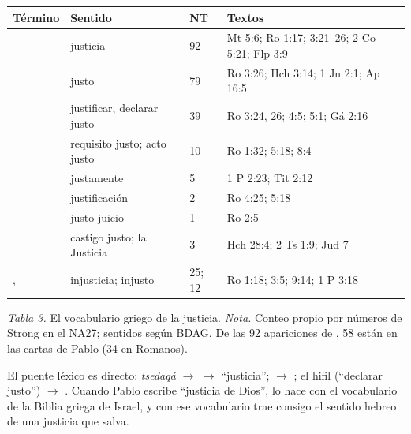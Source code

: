 \begin{center}\small\renewcommand{\arraystretch}{1.18}
\begin{tabular}{@{}L{3.0cm}L{3.6cm}L{1.3cm}L{5.6cm}@{}}
\toprule
\textbf{Término} & \textbf{Sentido} & \textbf{NT} & \textbf{Textos} \\ \midrule
{} & justicia & 92 & Mt 5:6; Ro 1:17; 3:21--26; 2 Co 5:21; Flp 3:9 \\
 & justo & 79 & Ro 3:26; Hch 3:14; 1 Jn 2:1; Ap 16:5 \\
 & justificar, declarar justo & 39 & Ro 3:24, 26; 4:5; 5:1; Gá 2:16 \\
 & requisito justo; acto justo & 10 & Ro 1:32; 5:18; 8:4 \\
 & justamente & 5 & 1 P 2:23; Tit 2:12 \\
 & justificación & 2 & Ro 4:25; 5:18 \\
 & justo juicio & 1 & Ro 2:5 \\
 & castigo justo; la Justicia & 3 & Hch 28:4; 2 Ts 1:9; Jud 7 \\
,  & injusticia; injusto & 25; 12 & Ro 1:18; 3:5; 9:14; 1 P 3:18 \\
\bottomrule
\end{tabular}\par
{\footnotesize\color{gris}\textit{Tabla 3.} El vocabulario griego de la justicia. \textit{Nota.} Conteo propio por números de Strong en el NA27; sentidos según BDAG. De las 92 apariciones de , 58 están en las cartas de Pablo (34 en Romanos).}
\end{center}

El puente léxico es directo:  \emph{tsedaqá} $\rightarrow$  $\rightarrow$ ``justicia'';  $\rightarrow$ ; el hifil  (``declarar justo'') $\rightarrow$ . Cuando Pablo escribe ``justicia de Dios'', lo hace con el vocabulario de la Biblia griega de Israel, y con ese vocabulario trae consigo el sentido hebreo de una justicia que salva.

